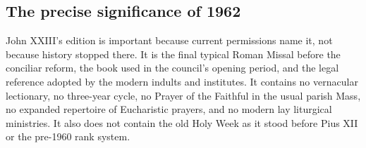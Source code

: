 \subsection{The precise significance of 1962}

John XXIII's edition is important because current permissions name it, not because history stopped there. It is the final typical Roman Missal before the conciliar reform, the book used in the council's opening period, and the legal reference adopted by the modern indults and institutes. It contains no vernacular lectionary, no three-year cycle, no Prayer of the Faithful in the usual parish Mass, no expanded repertoire of Eucharistic prayers, and no modern lay liturgical ministries. It also does not contain the old Holy Week as it stood before Pius XII or the pre-1960 rank system.

